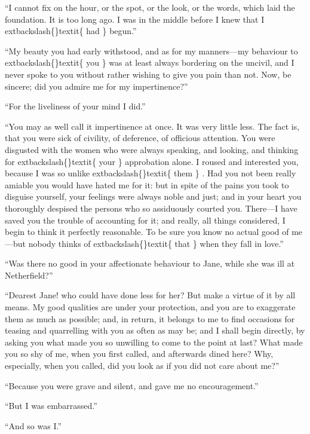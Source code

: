 \documentclass[10pt]{book}
\begin{document}
   “I cannot fix on the hour, or the spot, or the look, or the words, which
laid the foundation. It is too long ago. I was in the middle before I
knew that I
   	extbackslash\{\}textit\{
    had
   \}
   begun.”
  

   “My beauty you had early withstood, and as for my manners—my behaviour
to
   	extbackslash\{\}textit\{
    you
   \}
   was at least always bordering on the uncivil, and I never spoke
to you without rather wishing to give you pain than not. Now, be
sincere; did you admire me for my impertinence?”
  

   “For the liveliness of your mind I did.”
  

   “You may as well call it impertinence at once. It was very little less.
The fact is, that you were sick of civility, of deference, of officious
attention. You were disgusted with the women who were always speaking,
and looking, and thinking for
   	extbackslash\{\}textit\{
    your
   \}
   approbation alone. I roused and
interested you, because I was so unlike
   	extbackslash\{\}textit\{
    them
   \}
   . Had you not been really
amiable you would have hated me for it: but in spite of the pains you
took to disguise yourself, your feelings were always noble and just; and
in your heart you thoroughly despised the persons who so assiduously
courted you. There—I have saved you the trouble of accounting for it;
and really, all things considered, I begin to think it perfectly
reasonable. To be sure you know no actual good of me—but nobody thinks
of
   	extbackslash\{\}textit\{
    that
   \}
   when they fall in love.”
  

   “Was there no good in your affectionate behaviour to Jane, while she was
ill at Netherfield?”
  

   “Dearest Jane! who could have done less for her? But make a virtue of it
by all means. My good qualities are under your protection, and you are
to exaggerate them as much as possible; and, in return, it belongs to me
to find occasions for teasing and quarrelling with you as often as may
be; and I shall begin directly, by asking you what made you so unwilling
to come to the point at last?
   What made you so shy of me, when you
first called, and afterwards dined here? Why, especially, when you
called, did you look as if you did not care about me?”
  

   “Because you were grave and silent, and gave me no encouragement.”
  

   “But I was embarrassed.”
  

   “And so was I.”
  
\end{document}

